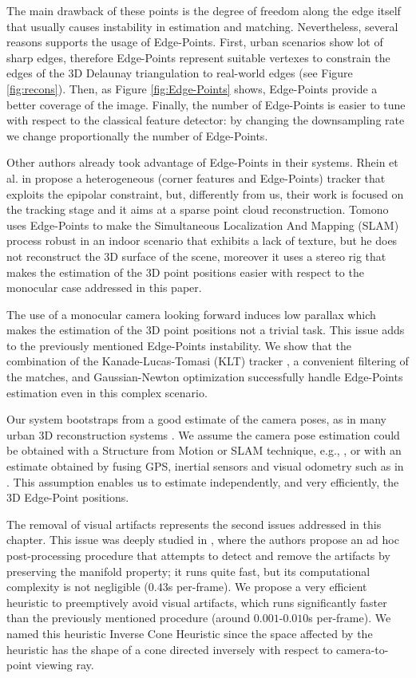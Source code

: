 The main drawback of these points is the degree of freedom along the edge itself that usually causes instability in estimation and matching.
Nevertheless, several reasons supports the usage of Edge-Points.
First, urban scenarios show lot of sharp edges, therefore Edge-Points represent suitable vertexes to constrain the edges of the 3D Delaunay triangulation to real-world edges (see Figure \ref{fig:recons}). 
Then, as Figure \ref{fig:Edge-Points} shows, Edge-Points provide a better coverage of the image.
Finally, the number of Edge-Points is easier to tune with respect to the classical feature detector: by changing the downsampling rate we change proportionally the number of Edge-Points.

Other authors \cite{Rhein_et_al13, Tomono09} already took advantage of Edge-Points in their systems. Rhein et al. in \cite{Rhein_et_al13} propose a heterogeneous (corner features and Edge-Points) tracker that exploits the epipolar constraint, but, differently from us, their work is focused on the tracking stage and it aims at a sparse point cloud reconstruction.
Tomono \cite{Tomono09}  uses Edge-Points to make  the Simultaneous Localization And Mapping (SLAM) process robust in an indoor scenario that exhibits a lack of texture, but he does not reconstruct the 3D surface of the scene, moreover it uses a stereo rig that makes the estimation of the 3D point positions easier with respect to the monocular case addressed in this paper.

The use of a monocular camera looking forward induces low parallax which makes  the estimation of the 3D point positions not a trivial task. This issue adds to the previously mentioned Edge-Points instability. 
We show that the combination of the  Kanade-Lucas-Tomasi (KLT) tracker \cite{Lucas_Kanade81}, a convenient filtering of the matches, and Gaussian-Newton optimization successfully handle Edge-Points estimation even in this complex scenario. 

Our system bootstraps from a good estimate of the camera poses, as in many urban 3D reconstruction systems \cite{ pollefeys_et_al_08,cornelis_et_al08}. 
We assume the camera pose estimation could be obtained with a Structure from Motion or SLAM technique, e.g., \cite{Snavely_et_al06},  or with an estimate obtained by fusing GPS, inertial sensors and visual odometry such as in \cite{Cucci_Matteucci14}.
This assumption enables us to estimate independently, and very efficiently, the 3D Edge-Point positions.

The removal of visual artifacts represents the second issues addressed
in this chapter. This issue was deeply studied in \cite{litvinov_Lhiuller14}, where the authors propose an ad hoc post-processing procedure that attempts to detect and remove the artifacts by preserving the manifold property; it runs quite fast, but its computational complexity is not negligible ($0.43$s per-frame).  
We propose a very efficient heuristic to preemptively avoid visual artifacts, which runs significantly faster than the previously mentioned procedure (around $0.001$-$0.010$s per-frame). We named this heuristic Inverse Cone Heuristic since the space affected by the heuristic has the shape of a cone directed inversely with respect to camera-to-point viewing ray.

